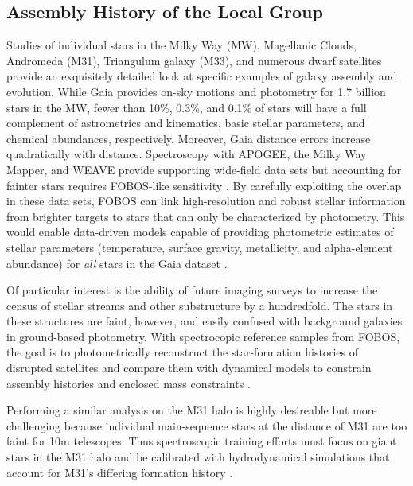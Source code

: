
\subsection{Assembly History of the Local Group}
\label{sec:localgroup}

Studies of individual stars in the Milky Way (MW), Magellanic Clouds, Andromeda (M31), Triangulum galaxy (M33), and
numerous dwarf satellites provide an exquisitely detailed look at specific examples of galaxy assembly and evolution.
While Gaia provides on-sky motions and photometry for 1.7 billion stars in the MW, fewer than 10\%, 0.3\%, and 0.1\% of
stars will have a full complement of astrometrics and kinematics, basic stellar parameters, and chemical abundances,
respectively.  Moreover, Gaia distance errors increase quadratically with distance.  Spectroscopy with APOGEE, the
Milky Way Mapper, and WEAVE provide supporting wide-field data sets but accounting for fainter stars requires
FOBOS-like sensitivity \citep[see][]{dey19,sanderson19}.  By carefully exploiting the overlap in these data sets, FOBOS
can link high-resolution and robust stellar information from brighter targets to stars that can only be characterized
by photometry.  This would enable data-driven models capable of providing photometric estimates of stellar
parameters (temperature, surface gravity, metallicity, and alpha-element abundance) for {\it all} stars in the Gaia
dataset  \citep[see][]{2015ApJ...808...16N, 2018arXiv180401530T, 2018arXiv180803278T}.

Of particular interest is the ability of future imaging surveys to increase the census of stellar streams and other
substructure by a hundredfold.  The stars in these structures are faint, however, and easily confused with background
galaxies in ground-based photometry.  With spectrocopic reference samples from FOBOS, the goal is to photometrically
reconstruct the star-formation histories of disrupted satellites and compare them with dynamical models to constrain
assembly histories and enclosed mass constraints \citep[e.g.,][]{2017ApJ...836..234S}.


Performing a similar analysis on the M31 halo is highly desireable but more challenging because individual
main-sequence stars at the distance of M31 are too faint for 10m telescopes.  Thus spectroscopic training efforts must
focus on giant stars in the M31 halo and be calibrated with hydrodynamical simulations that account for M31's differing
formation history  \citep[e.g.][]{2005MNRAS.356.1071R,li19}.



